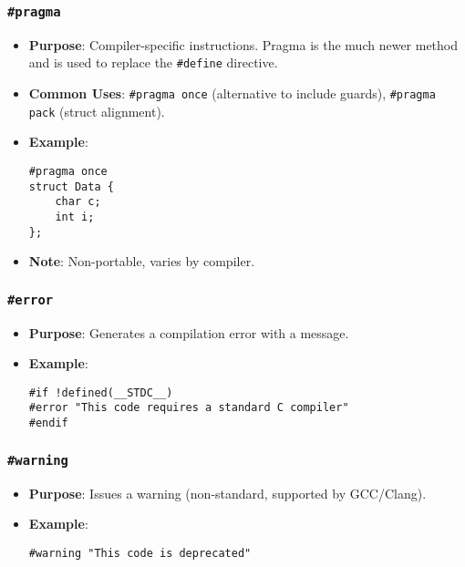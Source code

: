 \documentclass[a4paper,12pt]{article}
\begin{document}
\subsubsection{\texttt{\#pragma}}
\begin{itemize}[noitemsep]
    \item \textbf{Purpose}: Compiler-specific instructions. Pragma is the much newer method and is used to replace the \verb|#define| directive.
    \item \textbf{Common Uses}: \texttt{\#pragma once} (alternative to include guards), \texttt{\#pragma pack} (struct alignment).
    \item \textbf{Example}:

\begin{lstlisting}[caption=Pragma usage]
#pragma once
struct Data {
    char c;
    int i;
};
\end{lstlisting}

    \item \textbf{Note}: Non-portable, varies by compiler.
\end{itemize}

\subsubsection{\texttt{\#error}}
\begin{itemize}[noitemsep]
    \item \textbf{Purpose}: Generates a compilation error with a message.
    \item \textbf{Example}:
    
\begin{lstlisting}[caption=Error directive example]
#if !defined(__STDC__)
#error "This code requires a standard C compiler"
#endif
\end{lstlisting}
    
\end{itemize}

\subsubsection{\texttt{\#warning}}
\begin{itemize}[noitemsep]
    \item \textbf{Purpose}: Issues a warning (non-standard, supported by GCC/Clang).
    \item \textbf{Example}:

\begin{lstlisting}[caption=\#warning directive, something extra]
#warning "This code is deprecated"
\end{lstlisting}

\end{itemize}
\end{document}
